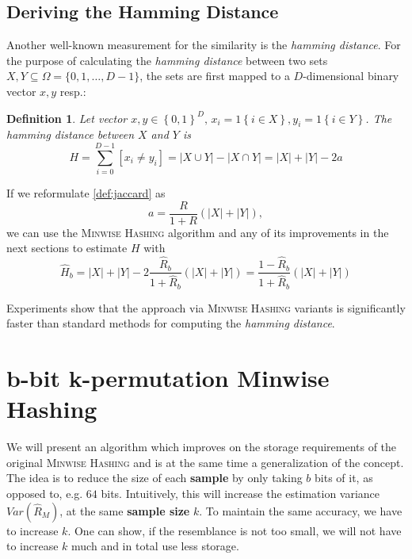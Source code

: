 \documentclass[a4paper]{article}
\newtheorem{mydef}{Definition}
\begin{document}
\subsection{Deriving the Hamming Distance} \label{sec:hammingDistance}

Another well-known measurement for the similarity is the \emph{hamming distance}. For the purpose of calculating the \emph{hamming distance} between two sets $X,Y \subseteq \Omega = \{0,1,\ldots,D-1\}$, the sets are first mapped to a $D$-dimensional binary vector $x,y$ resp.:
\begin{framed}
\begin{mydef}\label{def:hamming}
Let vector $x,y \in \left\lbrace 0,1 \right\rbrace ^D, \, x_i = 1\left\lbrace i \in X \right\rbrace, y_i = 1\left\lbrace i \in Y \right\rbrace$. The \emph{hamming distance} between $X$ and $Y$ is
\begin{equation}
H=\sum_{i=0}^{D-1}\left[ x_i \neq y_i \right]=|X \cup Y|-|X\cap Y|=|X|+|Y|-2a
\end{equation}
\end{mydef}
\end{framed}

If we reformulate \vref{def:jaccard} as
\begin{equation}
a=\frac{R}{1+R}(|X|+|Y|),
\end{equation}
we can use the \textsc{Minwise Hashing} algorithm and any of its improvements in the next sections to estimate $H$ with
\begin{equation}
\hat{H}_b=|X|+|Y|-2\frac{\hat{R}_b}{1+\hat{R}_b}(|X|+|Y|)=\frac{1-\hat{R}_b}{1+\hat{R}_b}(|X|+|Y|)
\end{equation}

Experiments show that the approach via \textsc{Minwise Hashing} variants is significantly faster than standard methods for computing the \emph{hamming distance}.



\section{b-bit k-permutation Minwise Hashing}\label{sec:b-bitMinwiseHashing}

We will present an algorithm which improves on the storage requirements of the original \textsc{Minwise Hashing} and is at the same time a generalization of the concept. The idea is to reduce the size of each \textbf{sample} by only taking $b$ bits of it, as opposed to, e.g. $64$ bits. Intuitively, this will increase the estimation variance $Var(\hat{R}_M)$, at the same \textbf{sample size} $k$. To maintain the same accuracy, we have to increase $k$. One can show, if the resemblance is not too small, we will not have to increase $k$ much and in total use less storage.
\end{document}
